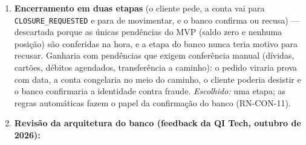 \documentclass[11pt,a4paper]{article}
\newcommand{\tb}[1]{\texttt{#1}}           %
\begin{document}
\begin{enumerate}
  nas rotas \tb{/internal/...} (RN-GER-14), barrado no código e testável.
  \item \textbf{Encerramento em duas etapas} (o cliente pede, a conta vai para
  \tb{CLOSURE_REQUESTED} e para de movimentar, e o banco confirma ou recusa) --- descartada porque
  as únicas pendências do MVP (saldo zero e nenhuma posição) são conferidas na hora, e a etapa do
  banco nunca teria motivo para recusar. Ganharia com pendências que exigem conferência manual
  (dívidas, cartões, débitos agendados, transferência a caminho): o pedido viraria prova com data,
  a conta congelaria no meio do caminho, o cliente poderia desistir e o banco confirmaria a
  identidade contra fraude. \emph{Escolhido:} uma etapa; as regras automáticas fazem o papel da
  confirmação do banco (RN-CON-11).

  \item[] \textbf{Revisão da arquitetura do banco (feedback da QI Tech, outubro de 2026):}


\end{enumerate}
\end{document}
